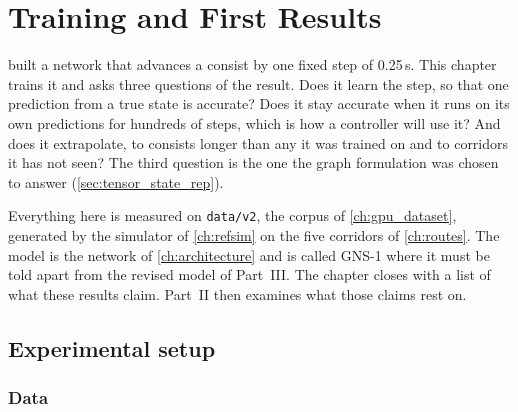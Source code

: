 \chapter{Training and First Results}
\label{ch:training}


 built a network that advances a consist by one fixed step of 0.25\,s. This chapter trains it and asks three questions of the result. Does it learn the step, so that one prediction from a true state is accurate? Does it stay accurate when it runs on its own predictions for hundreds of steps, which is how a controller will use it? And does it extrapolate, to consists longer than any it was trained on and to corridors it has not seen? The third question is the one the graph formulation was chosen to answer (\cref{sec:tensor_state_rep}).

Everything here is measured on \texttt{data/v2}, the corpus of \cref{ch:gpu_dataset}, generated by the simulator of \cref{ch:refsim} on the five corridors of \cref{ch:routes}. The model is the network of \cref{ch:architecture} and is called GNS-1 where it must be told apart from the revised model of Part~III. The chapter closes with a list of what these results claim. Part~II then examines what those claims rest on.

\section{Experimental setup}
\label{sec:train_setup}

\subsection{Data}

